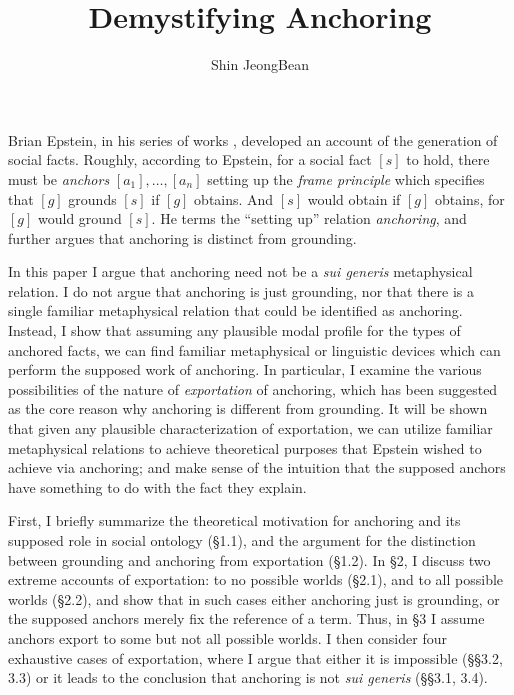\documentclass[12pt]{article}
\title{Demystifying Anchoring}
\author{Shin JeongBean}
\date{}
\begin{document}
\setlength{\parskip}{8pt}
\setlength{\parindent}{1em} 
\maketitle
Brian Epstein, in his series of works \citep{Epstein2014-EPSHMK, Epstein2014-EPSSOW, Epstein2014-EPSWII, Epstein2015-EPSTAT, Epstein2015-EPSAFF}, developed an account of the generation of social facts. Roughly, according to Epstein, for a social fact $[s]$ to hold, there must be \textit{anchors} $[a_1], \dots, [a_n]$ setting up the \textit{frame principle} which specifies that $[g]$ grounds $[s]$ if $[g]$ obtains. And $[s]$ would obtain if $[g]$ obtains, for $[g]$ would ground $[s]$. He terms the ``setting up'' relation \textit{anchoring}, and further argues that anchoring is distinct from grounding.

\par
In this paper I argue that anchoring need not be a \textit{sui generis} metaphysical relation. I do not argue that anchoring is just grounding, nor that there is a single familiar metaphysical relation that could be identified as anchoring. Instead, I show that assuming any plausible modal profile for the types of anchored facts, we can find familiar metaphysical or linguistic devices which can perform the supposed work of anchoring. In particular, I examine the various possibilities of the nature of \textit{exportation} of anchoring, which has been suggested as the core reason why anchoring is different from grounding. It will be shown that given any plausible characterization of exportation, we can utilize familiar metaphysical relations to achieve theoretical purposes that Epstein wished to achieve via anchoring; and make sense of the intuition that the supposed anchors have something to do with the fact they explain. 

\par
First, I briefly summarize the theoretical motivation for anchoring and its supposed role in social ontology (\S 1.1), and the argument for the distinction between grounding and anchoring from exportation (\S 1.2). In \S 2, I discuss two extreme accounts of exportation: to no possible worlds (\S 2.1), and to all possible worlds (\S 2.2), and show that in such cases either anchoring just is grounding, or the supposed anchors merely fix the reference of a term. Thus, in \S 3 I assume anchors export to some but not all possible worlds. I then consider four exhaustive cases of exportation, where I argue that either it is impossible (\S\S 3.2, 3.3) or it leads to the conclusion that anchoring is not \textit{sui generis} (\S\S 3.1, 3.4). 
\end{document}
